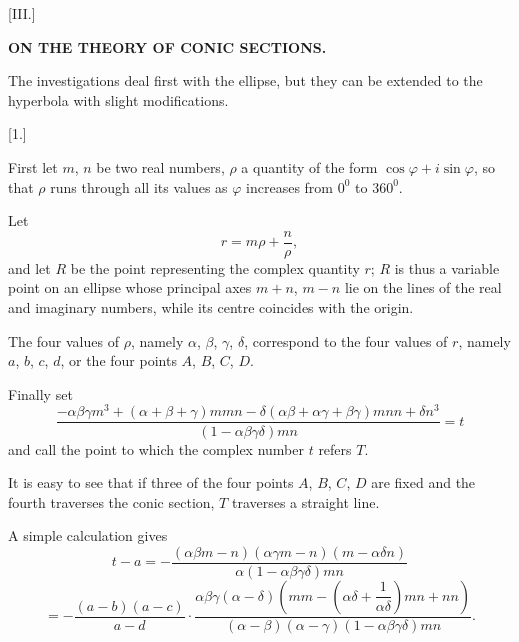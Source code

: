 
\begin{center}
[III.]

\textbf{ON THE THEORY OF CONIC SECTIONS.}
\end{center}

The investigations deal first with the ellipse, but they can be extended
to the hyperbola with slight modifications.

\begin{center}
[1.]
\end{center}

First let $m$, $n$ be two real numbers, $\rho$ a quantity of the
form $\cos\varphi + i\sin\varphi$, so that $\rho$ runs through all its values
as $\varphi$ increases from $0^0$ to $360^0$.

Let
\[
r = m\rho + \dfrac{n}{\rho},
\]
and let $R$ be the point representing the complex quantity $r$; $R$ is thus
a variable point on an ellipse whose principal axes $m+n$, $m-n$ lie on
the lines of the real and imaginary numbers, while its
centre coincides with the origin.

The four values of $\rho$, namely $\alpha$, $\beta$, $\gamma$, $\delta$,
correspond to the four values of $r$, namely $a$, $b$, $c$, $d$, or the four
points $A$, $B$, $C$, $D$.

Finally set
\[
\dfrac{-\alpha\beta\gamma m^3 + (\alpha+\beta+\gamma) m m n
  - \delta(\alpha\beta+\alpha\gamma+\beta\gamma) m n n + \delta n^3}
  {(1-\alpha\beta\gamma\delta) m n} = t
\]
and call the point to which the complex number $t$ refers $T$.

It is easy to see that if three of the four points $A$, $B$, $C$, $D$
are fixed and the fourth traverses the conic section, $T$ traverses a straight
line.

A simple calculation gives
\[
t - a = -\dfrac{(\alpha\beta m - n)(\alpha\gamma m - n)(m - \alpha\delta n)}
  {\alpha(1-\alpha\beta\gamma\delta) m n}
\]
\[
= -\dfrac{(a-b)(a-c)}{a-d} \cdot
  \dfrac{\alpha\beta\gamma(\alpha-\delta)\left(mm -
  \left(\alpha\delta+\dfrac{1}{\alpha\delta}\right) m n + n n\right)}
  {(\alpha-\beta)(\alpha-\gamma)(1-\alpha\beta\gamma\delta) m n}.
\]
